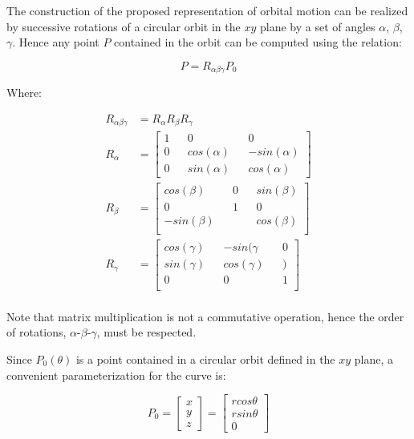 \indent 
The construction of the proposed representation of orbital motion can be realized by successive rotations of a circular orbit in the $xy$ plane by a set of angles $\alpha$, $\beta$, $\gamma$. Hence any point $P$ contained in the orbit can be computed using the relation:

\begin{equation}
	P = R_{\alpha \beta \gamma}P_{0}
\end{equation}

\indent
Where:

\begin{align}
	R_{\alpha \beta \gamma} &= R_{\alpha}R_{\beta}R_{\gamma} \\
	R_{\alpha} &= \begin{bmatrix}
					1 && 0           && 0            \\
					0 && cos(\alpha) && -sin(\alpha) \\
					0 && sin(\alpha) &&  cos(\alpha)
				 \end{bmatrix} \\			 
	R_{\beta} &= \begin{bmatrix}
					cos(\beta) && 0           && sin(\beta)         \\
					0 && 1 &&  0\\
					-sin(\beta) &&  &&  cos(\beta) \\
				 \end{bmatrix} \\			 
	R_{\gamma} &= \begin{bmatrix}
					cos(\gamma) && -sin(\gamma           && 0            \\
					sin(\gamma) && cos(\gamma) && ) \\
					0 && 0 &&  1 \\
				 \end{bmatrix} \\
\end{align}

\indent
Note that matrix multiplication is not a commutative operation, hence the order of rotations, $\alpha$-$\beta$-$\gamma$, must be respected.

\indent
Since $ P_0 (\theta) $ is a point contained in a circular orbit defined in the $xy$ plane, a convenient parameterization for the curve is:

\begin{equation}
	P_0 = \begin{bmatrix}
			x \\
			y \\
			z
		  \end{bmatrix} = \begin{bmatrix}
							r cos \theta \\
							r sin \theta \\
							0
		  				  \end{bmatrix}
\end{equation}

